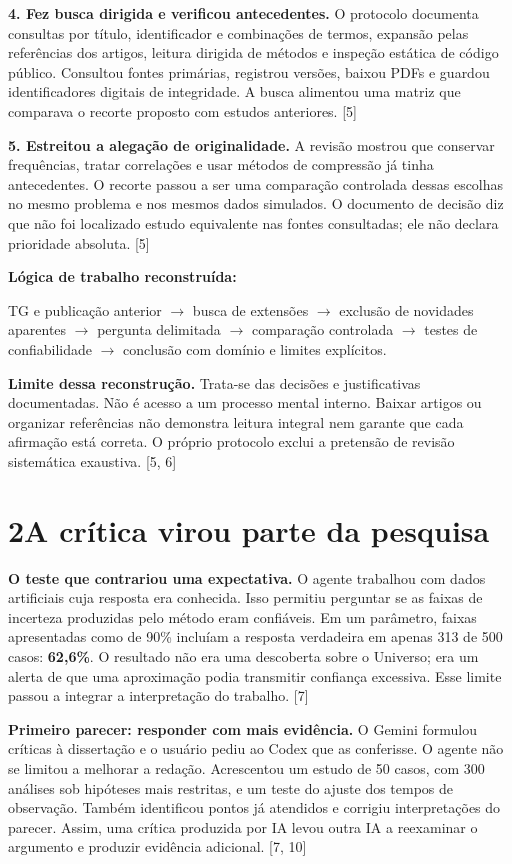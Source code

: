 \documentclass[11pt,a4paper]{article}
\newcommand{\fonte}[1]{{\small\color{navy}[#1]}}
\newcommand{\titulo}[2]{\section*{\color{navy}#1\quad #2}}
\begin{document}
\textbf{4. Fez busca dirigida e verificou antecedentes.} O protocolo documenta consultas por título, identificador e combinações de termos, expansão pelas referências dos artigos, leitura dirigida de métodos e inspeção estática de código público. Consultou fontes primárias, registrou versões, baixou PDFs e guardou identificadores digitais de integridade. A busca alimentou uma matriz que comparava o recorte proposto com estudos anteriores. \fonte{5}

\textbf{5. Estreitou a alegação de originalidade.} A revisão mostrou que conservar frequências, tratar correlações e usar métodos de compressão já tinha antecedentes. O recorte passou a ser uma comparação controlada dessas escolhas no mesmo problema e nos mesmos dados simulados. O documento de decisão diz que não foi localizado estudo equivalente nas fontes consultadas; ele não declara prioridade absoluta. \fonte{5}

\begin{destaque}
\textbf{Lógica de trabalho reconstruída:}\par
TG e publicação anterior $\rightarrow$ busca de extensões $\rightarrow$ exclusão de novidades aparentes $\rightarrow$ pergunta delimitada $\rightarrow$ comparação controlada $\rightarrow$ testes de confiabilidade $\rightarrow$ conclusão com domínio e limites explícitos.
\end{destaque}

\textbf{Limite dessa reconstrução.} Trata-se das decisões e justificativas documentadas. Não é acesso a um processo mental interno. Baixar artigos ou organizar referências não demonstra leitura integral nem garante que cada afirmação está correta. O próprio protocolo exclui a pretensão de revisão sistemática exaustiva. \fonte{5, 6}
\newpage

\titulo{2}{A crítica virou parte da pesquisa}
\textbf{O teste que contrariou uma expectativa.} O agente trabalhou com dados artificiais cuja resposta era conhecida. Isso permitiu perguntar se as faixas de incerteza produzidas pelo método eram confiáveis. Em um parâmetro, faixas apresentadas como de 90\% incluíam a resposta verdadeira em apenas 313 de 500 casos: \textbf{62,6\%}. O resultado não era uma descoberta sobre o Universo; era um alerta de que uma aproximação podia transmitir confiança excessiva. Esse limite passou a integrar a interpretação do trabalho. \fonte{7}

\textbf{Primeiro parecer: responder com mais evidência.} O Gemini formulou críticas à dissertação e o usuário pediu ao Codex que as conferisse. O agente não se limitou a melhorar a redação. Acrescentou um estudo de 50 casos, com 300 análises sob hipóteses mais restritas, e um teste do ajuste dos tempos de observação. Também identificou pontos já atendidos e corrigiu interpretações do parecer. Assim, uma crítica produzida por IA levou outra IA a reexaminar o argumento e produzir evidência adicional. \fonte{7, 10}
\end{document}
